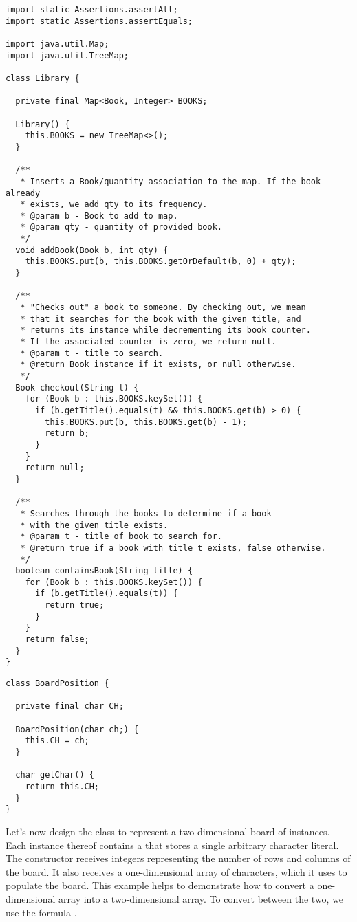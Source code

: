 \begin{lstlisting}[language=MyJava]
import static Assertions.assertAll;
import static Assertions.assertEquals;

import java.util.Map;
import java.util.TreeMap;

class Library {

  private final Map<Book, Integer> BOOKS;

  Library() {
    this.BOOKS = new TreeMap<>();
  }

  /**
   * Inserts a Book/quantity association to the map. If the book already
   * exists, we add qty to its frequency.
   * @param b - Book to add to map.
   * @param qty - quantity of provided book.
   */
  void addBook(Book b, int qty) {
    this.BOOKS.put(b, this.BOOKS.getOrDefault(b, 0) + qty);
  }

  /**
   * "Checks out" a book to someone. By checking out, we mean
   * that it searches for the book with the given title, and
   * returns its instance while decrementing its book counter.
   * If the associated counter is zero, we return null.
   * @param t - title to search.
   * @return Book instance if it exists, or null otherwise.
   */
  Book checkout(String t) {
    for (Book b : this.BOOKS.keySet()) {
      if (b.getTitle().equals(t) && this.BOOKS.get(b) > 0) {
        this.BOOKS.put(b, this.BOOKS.get(b) - 1);
        return b;
      }
    }
    return null;
  }

  /** 
   * Searches through the books to determine if a book
   * with the given title exists.
   * @param t - title of book to search for.
   * @return true if a book with title t exists, false otherwise.
   */
  boolean containsBook(String title) {
    for (Book b : this.BOOKS.keySet()) {
      if (b.getTitle().equals(t)) {
        return true;
      }
    }
    return false;
  }
}
\end{lstlisting}


\begin{lstlisting}[language=MyJava]
class BoardPosition {

  private final char CH;

  BoardPosition(char ch;) {
    this.CH = ch;
  }

  char getChar() { 
    return this.CH; 
  }
}
\end{lstlisting}

Let's now design the  class to represent a two-dimensional board of  instances.
Each instance thereof contains a  that stores a single arbitrary character literal.
The  constructor receives integers representing the number of rows and columns of the board.
It also receives a one-dimensional array of characters, which it uses to populate the board.
This example helps to demonstrate how to convert a one-dimensional array into a two-dimensional array.
To convert between the two, we use the formula .

